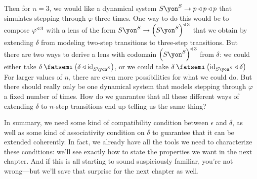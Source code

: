 \documentclass[Book-Poly]{subfiles}
\begin{document}
\begin{example}
Then for $n=3$, we would like a dynamical system $S\yon^S\to p\tri p\tri p$ that simulates stepping through $\varphi$ three times.
One way to do this would be to compose $\varphi^{\mathbin{\triangleleft}\,3}$ with a lens of the form $S\yon^S\to\left(S\yon^S\right)\tripow3$ that we obtain by extending $\delta$ from modeling two-step transitions to three-step transitions.
But there are two ways to derive a lens with codomain $\left(S\yon^S\right)\tripow3$ from $\delta$: we could either take $\delta\then\left(\delta\tri\id_{S\yon^S}\right)$, or we could take $\delta\then\left(\id_{S\yon^S}\tri\delta\right)$
For larger values of $n$, there are even more possibilities for what we could do.
But there should really only be one dynamical system that models stepping through $\varphi$ a fixed number of times.
How do we guarantee that all these different ways of extending $\delta$ to $n$-step transitions end up telling us the same thing?

In summary, we need some kind of compatibility condition between $\epsilon$ and $\delta$, as well as some kind of associativity condition on $\delta$ to guarantee that it can be extended coherently.
In fact, we already have all the tools we need to characterize these conditions: we'll see exactly how to state the properties we want in the next chapter.
And if this is all starting to sound suspiciously familiar, you’re not wrong—but we’ll save that surprise for the next chapter as well.
\end{example}
\end{document}
